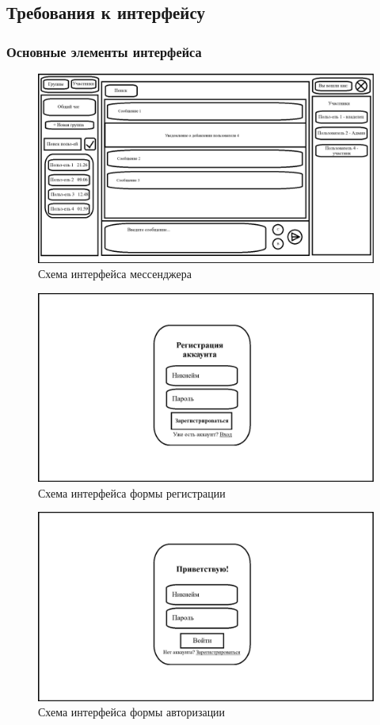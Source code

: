 \subsection{Требования к интерфейсу}

\subsubsection{Основные элементы интерфейса}

\begin{figure}[ht]
	\centering
	\includegraphics[width=0.8\linewidth]{"images/UI макет"}
	\caption{Схема интерфейса мессенджера}
	\label{fig:ui-main}
\end{figure}

\begin{figure}[ht]
	\centering
	\includegraphics[width=0.8\linewidth]{"images/UI макет регистрации"}
	\caption{Схема интерфейса формы регистрации}
	\label{fig:ui-reg}
\end{figure}

\begin{figure}[ht]
	\centering
	\includegraphics[width=0.8\linewidth]{"images/UI макет авторизации"}
	\caption{Схема интерфейса формы авторизации}
	\label{fig:ui-auth}
\end{figure}

